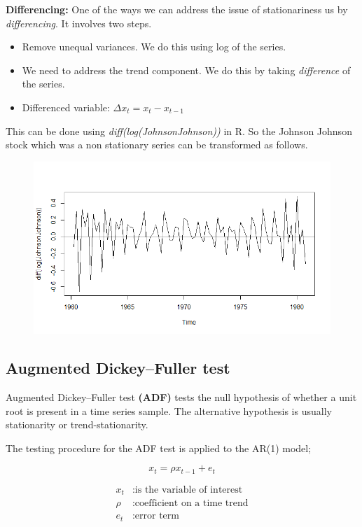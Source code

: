 \documentclass[a4paper]{article}
\theoremstyle{definition}
\begin{document}
\textbf{Differencing:} One of the ways we can address the issue of stationariness us by \textit{differencing}. It involves two steps. 
\begin{itemize}
	\item Remove unequal variances. We do this using log of the series. 
	\item We need to address the trend component. We do this by taking \textit{difference} of the series.
	\item Differenced variable: $ \Delta x_t = x_t - x_{t-1}$
\end{itemize} 

This can be done using \textit{diff(log(JohnsonJohnson))} in R. So the Johnson Johnson stock which was a non stationary series can be transformed as follows. 

\begin{figure}
[h]
	\includegraphics[width=0.9\linewidth]{difflog}
\end{figure}

\subsection{Augmented Dickey–Fuller test}
Augmented Dickey–Fuller test \textbf{(ADF)} tests the null hypothesis of whether a unit root is present in a time series sample. The alternative hypothesis is usually stationarity or trend-stationarity. 

The testing procedure for the ADF test is applied to the AR(1) model;

\begin{equation}
x_t = \rho x_{t-1} + e_t
\end{equation}

\begin{align*}
x_t &: \text{is the variable of interest}\\
\rho &: \text{coefficient on a time trend} \\
e_t &: \text{error term}
\end{align*}
\end{document}
